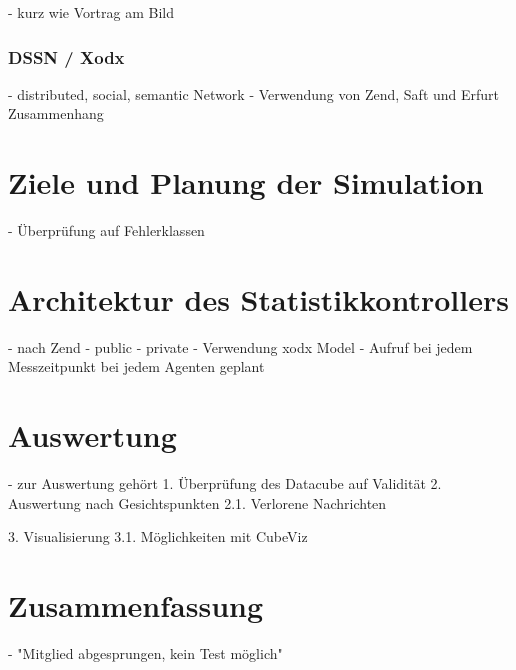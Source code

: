 \documentclass{article}
\begin{document}
- kurz wie Vortrag am Bild

\subsubsection{DSSN / Xodx}

- distributed, social, semantic Network
- Verwendung von Zend, Saft und Erfurt Zusammenhang

\section{Ziele und Planung der Simulation}

- Überprüfung auf Fehlerklassen

\section{Architektur des Statistikkontrollers}

- nach Zend
- public
- private
- Verwendung xodx Model
- Aufruf bei jedem Messzeitpunkt bei jedem Agenten geplant

\section{Auswertung}

- zur Auswertung gehört 
1. Überprüfung des Datacube auf Validität
2. Auswertung nach Gesichtspunkten
2.1. Verlorene Nachrichten

3. Visualisierung
3.1. Möglichkeiten mit CubeViz

\section{Zusammenfassung}

- "Mitglied abgesprungen, kein Test möglich"



\end{document}
